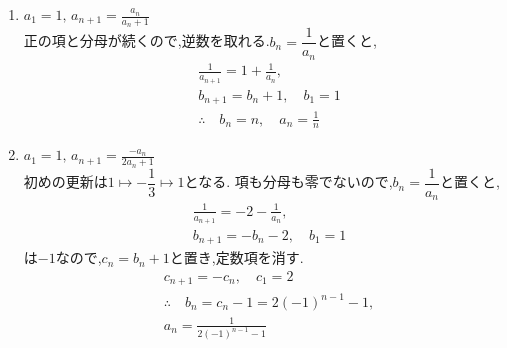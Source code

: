 \noindent{}\par\nobreak
\begin{enumerate}[label=(\arabic*),parsep=3pt,format=\bookitemlink{example-reciprocal-1}{solution}{problem}]
  \item $\displaystyle a_1=1,\, a_{n+1}=\frac{a_n}{a_n+1}$\\
    正の項と分母が続くので,逆数を取れる.$b_n=\dfrac{1}{a_n}$と置くと,
    \begin{align*}
      &\frac{1}{a_{n+1}}=1+\frac{1}{a_n},\\
      &b_{n+1}=b_n+1,\quad b_1=1\\
      &\therefore \quad b_n=n,\quad a_n=\frac1n
    \end{align*}
  \item $\displaystyle a_1=1,\, a_{n+1}=\frac{-a_n}{2a_n+1}$\\
    初めの更新は$1\longmapsto-\dfrac{1}{3}\longmapsto1$となる.
    項も分母も零でないので,$b_n=\dfrac{1}{a_n}$と置くと,
    \begin{align*}
      &\frac{1}{a_{n+1}}=-2-\frac{1}{a_n},\\
      &b_{n+1}=-b_n-2,\quad b_1=1
    \end{align*}
    は$-1$なので,$c_n=b_n+1$と置き,定数項を消す.
    \begin{align*}
      &c_{n+1}=-c_n,\quad c_1=2\\
      &\therefore \quad b_n=c_n-1=2(-1)^{n-1}-1,\\
      &a_n=\frac{1}{2(-1)^{n-1}-1}
    \end{align*}
\end{enumerate}
